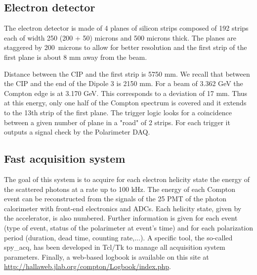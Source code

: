 {{\subsection{Electron detector}
\label{sec:compton_edet}

The electron detector is made of 4 planes of silicon strips composed
of 192 strips each of width 250 (200 + 50) microns and 500 microns
thick. The planes are staggered by 200~microns to allow for better
resolution and the first strip of the first plane is about 8 mm away from the
beam. 

Distance between the CIP and the first strip is 5750 mm. We recall that
between the CIP and the end of the Dipole 3 is 2150 mm.
For a beam of 3.362 GeV the Compton
edge is at 3.170 GeV. This corresponds to a deviation of 17 mm. Thus at
this energy, only one half of the Compton spectrum is covered and it extends
to the 13th strip of the first plane.
The trigger logic looks for a coincidence
between a given number of plane in a "road" of 2 strips. For each trigger
it outputs a signal check by the Polarimeter DAQ.

\subsection{Fast acquisition system}
\label{sec:compton_daq}
The goal of this system is to acquire
for each electron helicity state the energy of the scattered photons at a
rate up to 100 kHz. The energy of each Compton event can be
reconstructed from the signals of the 25 PMT of the photon calorimeter
with front-end electronics and ADCs. Each helicity state, given
by the accelerator, is also numbered.
Further information is given for each
event (type of event, status of the polarimeter at event's time) and for
each polarization period (duration, dead time, counting rate,...).
A specific tool, the so-called spy\_acq, has been developed in Tcl/Tk
to manage all acquisition system parameters. Finally, a web-based logbook
is available on this site at \url{http://hallaweb.jlab.org/compton/Logbook/index.php}.

}}
